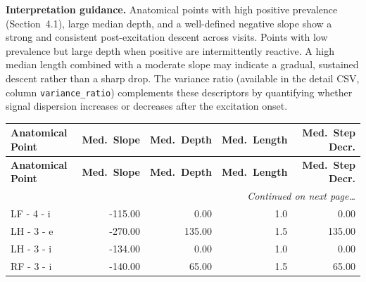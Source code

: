\documentclass[a4paper,11pt]{article}
\begin{document}
\medskip
\noindent\textbf{Interpretation guidance.}
Anatomical points with high positive prevalence (Section~4.1), large median depth, and a
well-defined negative slope show a strong and consistent post-excitation descent across
visits.
Points with low prevalence but large depth when positive are intermittently reactive.
A high median length combined with a moderate slope may indicate a gradual, sustained
descent rather than a sharp drop.
The variance ratio (available in the detail CSV, column \texttt{variance\_ratio}) complements
these descriptors by quantifying whether signal dispersion increases or decreases after the
excitation onset.

\begin{small}
\begin{longtable}{p{4.5cm}rrrr}
\toprule
\textbf{Anatomical Point} &
\textbf{Med.\ Slope} &
\textbf{Med.\ Depth} &
\textbf{Med.\ Length} &
\textbf{Med.\ Step Decr.} \\
\midrule
\endfirsthead
\toprule
\textbf{Anatomical Point} &
\textbf{Med.\ Slope} &
\textbf{Med.\ Depth} &
\textbf{Med.\ Length} &
\textbf{Med.\ Step Decr.} \\
\midrule
\endhead
\midrule
\multicolumn{5}{r}{\small\emph{Continued on next page\ldots}} \\
\endfoot
\bottomrule
\endlastfoot
LF - 4 - i & -115.00 & 0.00 & 1.0 & 0.00 \\
LH - 3 - e & -270.00 & 135.00 & 1.5 & 135.00 \\
LH - 3 - i & -134.00 & 0.00 & 1.0 & 0.00 \\
RF - 3 - i & -140.00 & 65.00 & 1.5 & 65.00 \\
\end{longtable}
\end{small}
\end{document}
